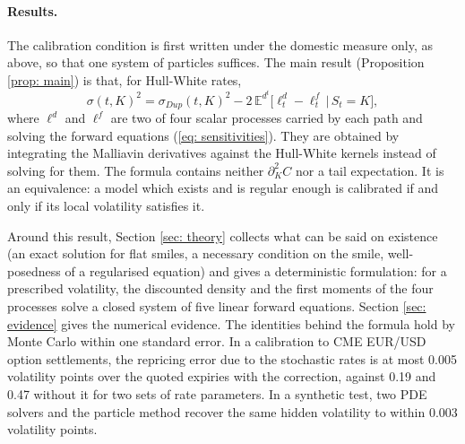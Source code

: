 \paragraph{Results.} The calibration condition is first written under the domestic measure only, as above, so that one system of particles suffices. The main result (Proposition \ref{prop: main}) is that, for Hull-White rates,
\[
\sigma(t,K)^2=\sigma_{Dup}(t,K)^2-2\,\mathbb{E}^{d^t}\big[\ell^d_t-\ell^f_t\,\big|\,S_t=K\big],
\]
where $\ell^d$ and $\ell^f$ are two of four scalar processes carried by each path and solving the forward equations (\ref{eq: sensitivities}). They are obtained by integrating the Malliavin derivatives against the Hull-White kernels instead of solving for them. The formula contains neither $\partial^2_KC$ nor a tail expectation. It is an equivalence: a model which exists and is regular enough is calibrated if and only if its local volatility satisfies it.

Around this result, Section \ref{sec: theory} collects what can be said on existence (an exact solution for flat smiles, a necessary condition on the smile, well-posedness of a regularised equation) and gives a deterministic formulation: for a prescribed volatility, the discounted density and the first moments of the four processes solve a closed system of five linear forward equations. Section \ref{sec: evidence} gives the numerical evidence. The identities behind the formula hold by Monte Carlo within one standard error. In a calibration to CME EUR/USD option settlements, the repricing error due to the stochastic rates is at most 0.005 volatility points over the quoted expiries with the correction, against 0.19 and 0.47 without it for two sets of rate parameters. In a synthetic test, two PDE solvers and the particle method recover the same hidden volatility to within 0.003 volatility points.

